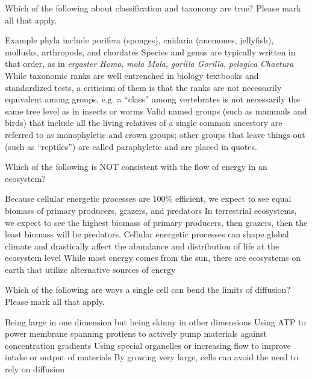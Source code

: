 \documentclass[exam,addpoints,answers]{exam}
\begin{document}
\begin{questions}
\question[1] Which of the following about classification and taxonomy are true? Please mark all that apply.
\begin{choices}
\CorrectChoice Example phyla include porifera (sponges), cnidaria (anemones, jellyfish), mollusks, arthropods, and chordates 
\choice Species and genus are typically written in that order, as in \emph{ergaster Homo}, \emph{mola Mola}, \emph{gorilla Gorilla}, \emph{pelagica Chaetura}
\CorrectChoice While taxonomic ranks are well entrenched in biology textbooks and standardized tests, a criticism of them is that the ranks are not necessarily equivalent among groups, e.g. a ``class'' among vertebrates is not necessarily the same tree level as in insects or worms
\CorrectChoice Valid named groups (such as mammals and birds) that include all the living relatives of a single common ancestory are referred to as monophyletic and crown groups; other groups that leave things out (such as ``reptiles'') are called paraphyletic and are placed in quotes. 
\end{choices}



\clearpage
\question[1] Which of the following is NOT consistent with the flow of energy in an ecosystem?
\begin{choices}
\CorrectChoice Because cellular energetic processes are 100\% efficient, we expect to see equal biomass of primary producers, grazers, and predators
\choice In terrestrial ecosystems, we expect to see the highest biomass of primary producers, then grazers, then the least biomass will be predators. 
\choice Cellular energetic processes can shape global climate and drastically affect the abundance and distribution of life at the ecosystem level
\choice While most energy comes from the sun, there are ecosystems on earth that utilize alternative sources of energy
\end{choices}





\question[1] Which of the following are ways a single cell can bend the limits of diffusion? Please mark all that apply. 
\begin{choices}
\CorrectChoice Being large in one dimension but being skinny in other dimensions
\CorrectChoice Using ATP to power membrane spanning protiens to actively pump materials against concentration gradients
\CorrectChoice Using special organelles or increasing flow to improve intake or output of materials
\choice By growing very large, cells can avoid the need to rely on diffusion
\end{choices}





\end{questions}
\end{document}
